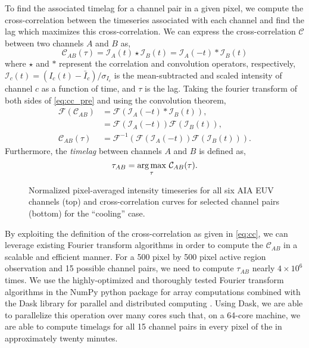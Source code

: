 To find the associated timelag for a channel pair in a given pixel, we compute the cross-correlation between the timeseries associated with each channel and find the lag which maximizes this cross-correlation. We can express the cross-correlation $\mathcal{C}$ between two channels $A$ and $B$ as,
\begin{equation}\label{eq:cc_pre}
    \mathcal{C}_{AB}(\tau) = \mathcal{I}_A(t)\star\mathcal{I}_B(t) = \mathcal{I}_A(-t)\ast\mathcal{I}_B(t)
\end{equation}
where $\star$ and $\ast$ represent the correlation and convolution operators, respectively, $\mathcal{I}_c(t)=(I_c(t)-\bar{I}_c)/\sigma_{I_c}$ is the mean-subtracted and scaled intensity of channel $c$ as a function of time, and $\tau$ is the lag. Taking the fourier transform of both sides of \autoref{eq:cc_pre} and using the convolution theorem,
\begin{align}\label{eq:cc}
    \mathcal{F}(\mathcal{C}_{AB}) &= \mathcal{F}(\mathcal{I}_A(-t)\ast\mathcal{I}_B(t)), \nonumber\\
    &= \mathcal{F}(\mathcal{I}_A(-t))\mathcal{F}(\mathcal{I}_B(t)), \nonumber\\
    \mathcal{C}_{AB}(\tau) &= \mathcal{F}^{-1}(\mathcal{F}(\mathcal{I}_A(-t))\mathcal{F}(\mathcal{I}_B(t))).
\end{align}
Furthermore, the \textit{timelag} between channels $A$ and $B$ is defined as,
\begin{equation}\label{eq:timelag}
    \tau_{AB} = \argmax_{\tau}\,\mathcal{C}_{AB}(\tau).
\end{equation}

\begin{figure}
    \caption{Normalized pixel-averaged intensity timeseries for all six AIA EUV channels (top) and cross-correlation curves for selected channel pairs (bottom) for the ``cooling'' case.}
    \label{fig:correlation_1d}
\end{figure}

By exploiting the definition of the cross-correlation as given in \autoref{eq:cc}, we can leverage existing Fourier transform algorithms in order to compute the $\mathcal{C}_{AB}$ in a scalable and efficient manner. For a 500 pixel by 500 pixel active region observation and 15 possible channel pairs, we need to compute $\tau_{AB}$ nearly $4\times10^6$ times. We use the highly-optimized and thoroughly tested Fourier transform algorithms in the NumPy python package for array computations \citep{oliphant_guide_2006} combined with the Dask library for parallel and distributed computing \citep{dask_development_team_dask_2016}. Using Dask, we are able to parallelize this operation over many cores such that, on a 64-core machine, we are able to compute timelags for all 15 channel pairs in every pixel of the \AR{} in approximately twenty minutes.